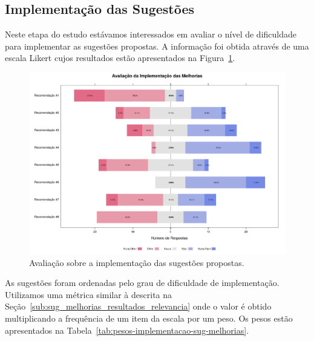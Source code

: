 \subsection{Implementação das Sugestões}
\label{sub:sug_melhorias_resultados_implementacao}

Neste etapa do estudo estávamos interessados em avaliar o nível de dificuldade
para implementar as sugestões propostas. A informação foi obtida através de uma
escala Likert cujos resultados estão apresentados na
Figura~\ref{fig:plot_likert_avaliacao_implementacao_melhorias}.

\begin{figure}[htpb]
    \centering
    \includegraphics[width=1.1\linewidth]{chapter-sugestoes-melhorias-fgrm/img/plot_likert_avaliacao_implementacao_melhorias.pdf}
    \caption{Avaliação sobre a  implementação das sugestões propostas.}
\label{fig:plot_likert_avaliacao_implementacao_melhorias}
\end{figure}

As sugestões foram ordenadas pelo grau de dificuldade de implementação.
Utilizamos uma métrica similar à descrita na
Seção~\ref{sub:sug_melhorias_resultados_relevancia} onde o valor é obtido
multiplicando a frequência de um  item da escala por um peso. Os pesos estão
apresentados na Tabela~\ref{tab:pesos-implementacao-sug-melhorias}.

\begin{table}[htpb]
\centering
{}
\caption{Pesos utilizados no ranqueamento das sugestões de melhorias}
\label{tab:pesos-implementacao-sug-melhorias}
\end{table}



